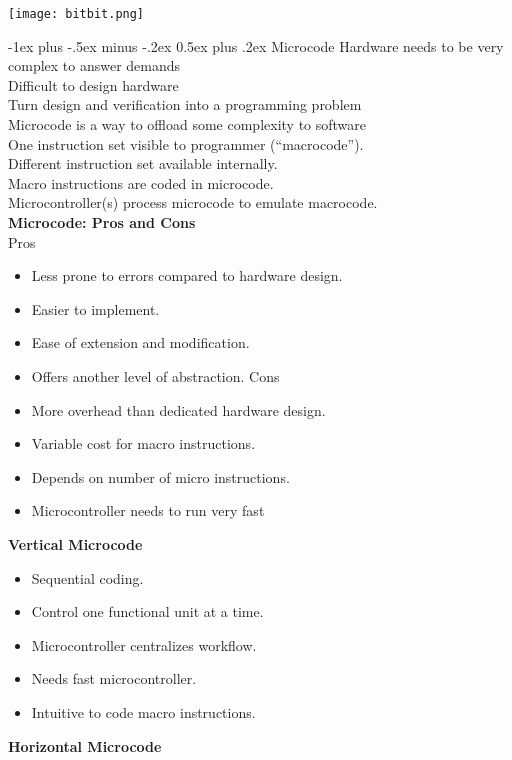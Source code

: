 \documentclass[letterpaper, 8pt]{extarticle}
\makeatletter
\renewcommand{\section}{\@startsection{section}{1}{0mm}%
                                {-1ex plus -.5ex minus -.2ex}%
                                {0.5ex plus .2ex}%
                                {\normalfont\normalsize\bfseries}}
\makeatother
\begin{document}
\begin{multicols*}{6}
	\texttt{[image: bitbit.png]}

    \section{Microcode}
	Hardware needs to be very complex to answer demands\\
	Difficult to design hardware\\
	Turn design and verification into a programming problem\\
	Microcode is a way to offload some complexity to software\\
	One instruction set visible to programmer (“macrocode”).\\
	Different instruction set available internally.\\
	Macro instructions are coded in microcode.\\
	Microcontroller(s) process microcode to emulate macrocode.\\
	\textbf{Microcode: Pros and Cons}\\
   Pros\\
	\begin{itemize}
	\item Less prone to errors compared to hardware design.
	\item Easier to implement.
	\item Ease of extension and modification.
	\item Offers another level of abstraction.
	Cons\\
	\item More overhead than dedicated hardware design.
	\item Variable cost for macro instructions.
	\item Depends on number of micro instructions.
	\item Microcontroller needs to run very fast
	\end{itemize}
	\textbf{Vertical Microcode}\\
	\begin{itemize}
	\item Sequential coding.
	\item Control one functional unit at a time.
	\item Microcontroller centralizes workflow.
	\item Needs fast microcontroller.
	\item Intuitive to code macro instructions.
	\end{itemize}
	\textbf{Horizontal Microcode}\\

\end{multicols*}
\end{document}
